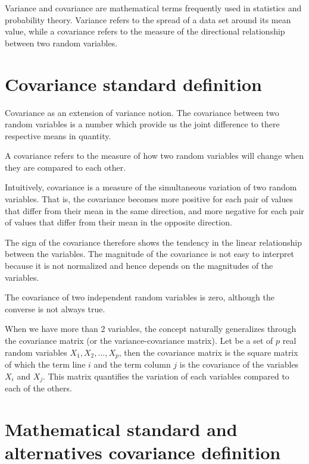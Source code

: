 \documentclass[
]{report}
\begin{document}
Variance and covariance are mathematical terms frequently used in statistics and probability theory. Variance refers to the spread of a data set around its mean value, while a covariance refers to the measure of the directional relationship between two random variables.

\hypertarget{covariance-standard-definition}{%
\section{Covariance standard definition}\label{covariance-standard-definition}}

Covariance as an extension of variance notion. The covariance between two random variables is a number which provide us the joint difference to there respective means in quantity.

A covariance refers to the measure of how two random variables will change when they are compared to each other.

Intuitively, covariance is a measure of the simultaneous variation of two random variables. That is, the covariance becomes more positive for each pair of values that differ from their mean in the same direction, and more negative for each pair of values that differ from their mean in the opposite direction.

The sign of the covariance therefore shows the tendency in the linear relationship between the variables. The magnitude of the covariance is not easy to interpret because it is not normalized and hence depends on the magnitudes of the variables.

The covariance of two independent random variables is zero, although the converse is not always true.

When we have more than 2 variables, the concept naturally generalizes through the covariance matrix (or the variance-covariance matrix). Let be a set of \(p\) real random variables \(X_1, X_2, \dots, X_p\), then the covariance matrix is the square matrix of which the term line \(i\) and the term column \(j\) is the covariance of the variables \(X_i\) and \(X_j\).
This matrix quantifies the variation of each variables compared to each of the others.

\hypertarget{mathematical-standard-and-alternatives-covariance-definition}{%
\section{Mathematical standard and alternatives covariance definition}\label{mathematical-standard-and-alternatives-covariance-definition}}
\end{document}
